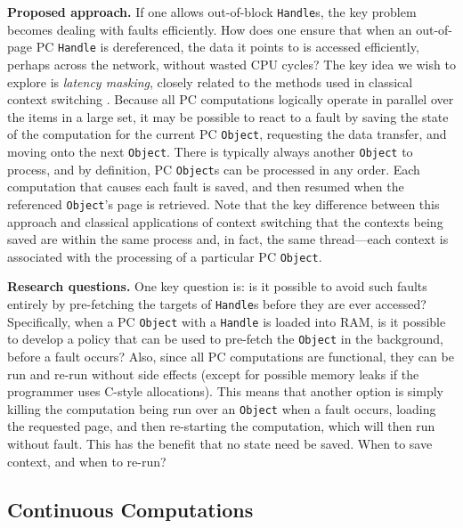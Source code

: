 \vspace{5 pt} 
\noindent
\textbf{Proposed approach.}
If one allows out-of-block \texttt{Handle}s, the key problem becomes dealing with faults efficiently.  
How does one ensure that when an out-of-page PC \texttt{Handle} is dereferenced,
the data it points to is accessed efficiently, perhaps across the network, without wasted CPU cycles? 
The key idea we wish to explore is \emph{latency masking}, closely related to the methods used in classical context switching \cite{silberschatz2014operating}.  
Because all PC computations logically operate in parallel over the items in a large set,
it may be possible to react to a fault 
by saving the state 
of the computation for the current PC \texttt{Object}, requesting the data transfer,
and moving onto the next \texttt{Object}. There is typically always another \texttt{Object} to process, 
and by definition, PC \texttt{Object}s can 
be processed in any order.  Each computation that causes
each fault is saved, and then resumed when the referenced \texttt{Object}'s page is retrieved.
Note that the key difference between this approach and classical applications of context switching that the contexts being saved
are within the same process and, in fact, the same thread---each context
is associated with the processing of a particular PC \texttt{Object}.

\vspace{5 pt} 
\noindent
\textbf{Research questions.} 
One key question is: is it possible to avoid such faults entirely by pre-fetching the targets of \texttt{Handle}s before they are
ever accessed?  Specifically, when a PC \texttt{Object} with a \texttt{Handle} is loaded into RAM, is it possible to develop a policy that
can be used to pre-fetch the \texttt{Object} in the background, before a fault occurs?
Also, since all PC computations are functional, they can be run and re-run without side effects (except for possible memory leaks
if the programmer uses C-style allocations).  This means that another option is simply killing the computation being run over an
\texttt{Object} when a fault occurs, loading the requested page, and then re-starting the computation, which will then run without fault.
This has the benefit that no state need be saved.
When to save context, and when to re-run?  

\subsection{Continuous Computations}

